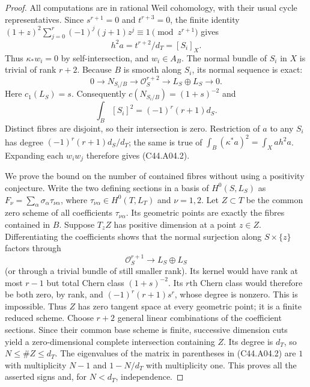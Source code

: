 \begin{proof}
All computations are in rational Weil cohomology, with their usual
cycle representatives. Since $s^{r+1}=0$ and $t^{r+3}=0$, the finite
identity $(1+z)^2\sum_{j=0}^r(-1)^j(j+1)z^j\equiv1\pmod{z^{r+1}}$
gives
\[
                      h^2a=t^{r+2}/d_T=[S_i]_X.
\]
Thus $\kappa_*w_i=0$ by self-intersection, and $w_i\in A_B$.
The normal bundle of $S_i$ in $X$ is trivial of rank $r+2$.
Because $B$ is smooth along $S_i$, its normal sequence is exact:
\[
 0\longrightarrow N_{S_i/B}\longrightarrow\mathcal O_S^{r+2}
   \longrightarrow L_S\oplus L_S\longrightarrow0.
\]
Here $c_1(L_S)=s$. Consequently
$c(N_{S_i/B})=(1+s)^{-2}$ and
\[
                 \int_B[S_i]^2=(-1)^r(r+1)d_S.
\]
Distinct fibres are disjoint, so their intersection is zero.
Restriction of $a$ to any $S_i$ has degree
$(-1)^r(r+1)d_S/d_T$; the same is true of
$\int_B(\kappa^*a)^2=\int_Xa h^2a$.
Expanding each $w_iw_j$ therefore gives (C44.A04.2).

We prove the bound on the number of contained fibres without using a
positivity conjecture. Write the two defining sections in a basis of
$H^0(S,L_S)$ as
$F_\nu=\sum_\alpha\sigma_\alpha\tau_{\nu\alpha}$,
where $\tau_{\nu\alpha}\in H^0(T,L_T)$ and $\nu=1,2$.
Let $Z\subset T$ be the common zero scheme of all coefficients
$\tau_{\nu\alpha}$. Its geometric points are exactly the fibres
contained in $B$. Suppose $T_zZ$ has positive dimension at a point
$z\in Z$. Differentiating the coefficients shows that the normal
surjection along $S\times\{z\}$ factors through
\[
       \mathcal O_S^{r+1}\longrightarrow L_S\oplus L_S
\]
(or through a trivial bundle of still smaller rank). Its kernel
would have rank at most $r-1$ but total Chern class $(1+s)^{-2}$.
Its $r$th Chern class would therefore be both zero, by rank, and
$(-1)^r(r+1)s^r$, whose degree is nonzero. This is impossible.
Thus $Z$ has zero tangent space at every geometric point; it is a
finite reduced scheme. Choose $r+2$ general linear combinations of
the coefficient sections. Since their common base scheme is finite,
successive dimension cuts yield a zero-dimensional complete
intersection containing $Z$. Its degree is $d_T$, so
$N\le\#Z\le d_T$.
The eigenvalues of the matrix in parentheses in (C44.A04.2) are
$1$ with multiplicity $N-1$ and $1-N/d_T$ with multiplicity one.
This proves all the asserted signs and, for $N<d_T$, independence.


\end{proof}
